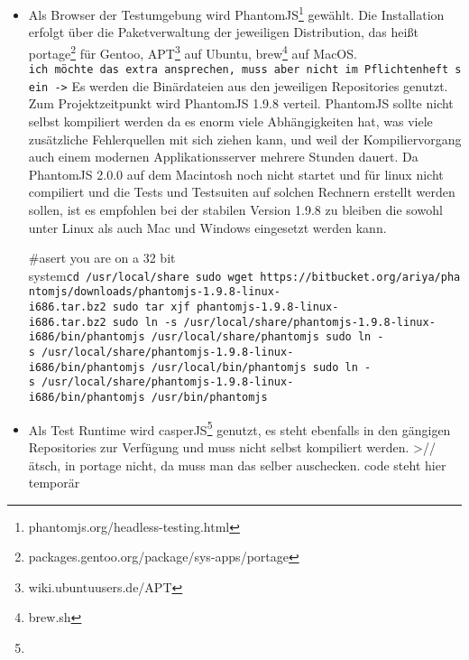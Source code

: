\begin{itemize}
\item
  Als Browser der Testumgebung wird PhantomJS\footnote{phantomjs.org/headless-testing.html}
  gewählt. Die Installation erfolgt über die Paketverwaltung der
  jeweiligen Distribution, das heißt portage\footnote{packages.gentoo.org/package/sys-apps/portage}
  für Gentoo, APT\footnote{wiki.ubuntuusers.de/APT} auf Ubuntu,
  brew\footnote{brew.sh} auf MacOS.
  \texttt{ich\ möchte\ das\ extra\ ansprechen,\ muss\ aber\ nicht\ im\ Pflichtenheft\ sein\ -\textgreater{}}
  Es werden die Binärdateien aus den jeweiligen Repositories genutzt.
  Zum Projektzeitpunkt wird PhantomJS 1.9.8 verteil. PhantomJS sollte
  nicht selbst kompiliert werden da es enorm viele Abhängigkeiten hat,
  was viele zusätzliche Fehlerquellen mit sich ziehen kann, und weil der
  Kompiliervorgang auch einem modernen Applikationsserver mehrere
  Stunden dauert. Da PhantomJS 2.0.0 auf dem Macintosh noch nicht
  startet und für linux nicht compiliert und die Tests und Testsuiten
  auf solchen Rechnern erstellt werden sollen, ist es empfohlen bei der
  stabilen Version 1.9.8 zu bleiben die sowohl unter Linux als auch Mac
  und Windows eingesetzt werden kann.

  \#asert you are on a 32 bit
  system\texttt{cd\ /usr/local/share\ sudo\ wget\ https://bitbucket.org/ariya/phantomjs/downloads/phantomjs-1.9.8-linux-i686.tar.bz2\ sudo\ tar\ xjf\ phantomjs-1.9.8-linux-i686.tar.bz2\ sudo\ ln\ -s\ /usr/local/share/phantomjs-1.9.8-linux-i686/bin/phantomjs\ /usr/local/share/phantomjs\ sudo\ ln\ -s\ /usr/local/share/phantomjs-1.9.8-linux-i686/bin/phantomjs\ /usr/local/bin/phantomjs\ sudo\ ln\ -s\ /usr/local/share/phantomjs-1.9.8-linux-i686/bin/phantomjs\ /usr/bin/phantomjs}
\item
  Als Test Runtime wird casperJS\footnote{} genutzt, es steht ebenfalls
  in den gängigen Repositories zur Verfügung und muss nicht selbst
  kompiliert werden. \textgreater{}//ätsch, in portage nicht, da muss
  man das selber auschecken. code steht hier temporär


\end{itemize}
